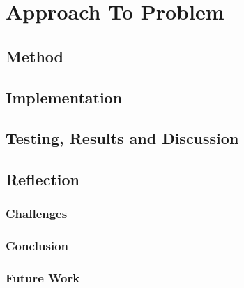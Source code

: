 \part{Approach To Problem}
\chapter{Method}
\chapter{Implementation}
\chapter{Testing, Results and Discussion}
\chapter{Reflection}
\section{Challenges}
\section{Conclusion}
\section{Future Work}
